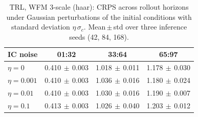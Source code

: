 \begin{table}[ht]
\centering
\caption{TRL, WFM 3-scale (haar): CRPS across rollout horizons under Gaussian perturbations of the initial conditions with standard deviation $\eta\,\sigma_c$. Mean\,$\pm$\,std over three inference seeds (42, 84, 168).}
\label{tab:ic_pert_crps}
\begin{tabular}{lccc}
\toprule
IC noise & 01:32 & 33:64 & 65:97 \\
\midrule
$\eta=0$ & 0.410{\scriptsize$\,\pm\,$0.003} & 1.018{\scriptsize$\,\pm\,$0.011} & 1.178{\scriptsize$\,\pm\,$0.030} \\
$\eta=0.001$ & 0.410{\scriptsize$\,\pm\,$0.003} & 1.036{\scriptsize$\,\pm\,$0.016} & 1.180{\scriptsize$\,\pm\,$0.024} \\
$\eta=0.01$ & 0.410{\scriptsize$\,\pm\,$0.003} & 1.030{\scriptsize$\,\pm\,$0.016} & 1.190{\scriptsize$\,\pm\,$0.007} \\
$\eta=0.1$ & 0.413{\scriptsize$\,\pm\,$0.003} & 1.026{\scriptsize$\,\pm\,$0.040} & 1.203{\scriptsize$\,\pm\,$0.012} \\
\bottomrule
\end{tabular}
\end{table}
